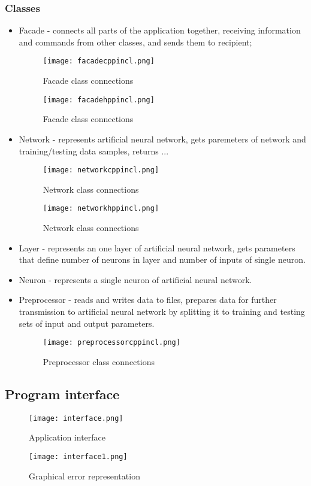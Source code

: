\documentclass[a4paper,12pt]{article}
\begin{document}
\subsubsection{Classes}
\begin{itemize}
 \item Facade - connects all parts of the application together, receiving information and commands from other classes, and sends them to recipient;
 \begin{figure}[ht]
 \centering
 \texttt{[image: facadecppincl.png]}
 \caption{Facade class connections}
\end{figure}

 \begin{figure}[ht]
 \centering
 \texttt{[image: facadehppincl.png]}
 \caption{Facade class connections}
\end{figure}

\item Network - represents artificial neural network, gets paremeters of network and training/testing data samples, returns ...

 \begin{figure}[ht]
 \centering
 \texttt{[image: networkcppincl.png]}
 \caption{Network class connections}
\end{figure}

 \begin{figure}[ht]
 \centering
 \texttt{[image: networkhppincl.png]}
 \caption{Network class connections}
\end{figure}

\item Layer - represents an one layer of artificial neural network, gets parameters that define number of neurons in layer and number of inputs of single neuron.

\item Neuron - represents a single neuron of artificial neural network.

\item Preprocessor - reads and writes data to files, prepares data for further transmission to artificial neural network by splitting it to training and testing sets of input and output parameters.

 \begin{figure}[ht]
 \centering
 \texttt{[image: preprocessorcppincl.png]}
 \caption{Preprocessor class connections}
\end{figure}

\end{itemize}

\subsection{Program interface}
\begin{figure}[ht]
 \centering
 \texttt{[image: interface.png]}
 \caption{Application interface}
\end{figure}

\begin{figure}[ht]
 \centering
 \texttt{[image: interface1.png]}
 \caption{Graphical error representation}
\end{figure}
\end{document}
